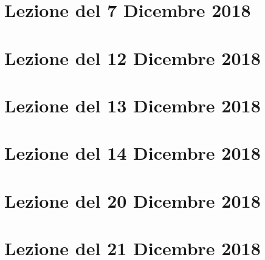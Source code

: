 \documentclass[10pt]{article}
\theoremstyle{plain}
\theoremstyle{definition}
\begin{document}
\section{Lezione del 7 Dicembre 2018}
\section{Lezione del 12 Dicembre 2018}
\section{Lezione del 13 Dicembre 2018}
\section{Lezione del 14 Dicembre 2018}
\section{Lezione del 20 Dicembre 2018}
\section{Lezione del 21 Dicembre 2018}










\end{document}
